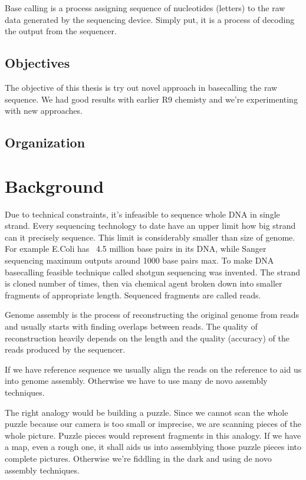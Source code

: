\documentclass[times, utf8, diplomski, english]{fer}
\begin{document}
Base calling is a process assigning sequence of nucleotides (letters) to the raw data generated by the sequencing device. Simply put, it is a process of decoding the output from the sequencer.

\section{Objectives}

The objective of this thesis is try out novel approach in basecalling the raw sequence. We had good results with earlier R9 chemisty \citep{miculinic2017mincall} and we're experimenting with new approaches.

\section{Organization}


\chapter{Background}
\label{chap:background}

Due to technical constraints, it's infeasible  to sequence whole DNA in single strand. 
Every sequencing technology to date have an upper limit how big strand can it precisely sequence.
This limit is considerably smaller than size of genome.
For example E.Coli has ~4.5 million base pairs in its DNA, while Sanger sequencing maximum outputs around 1000 base pairs max.
To make DNA basecalling feasible technique called shotgun sequencing was invented. 
The strand is cloned number of times, then via chemical  agent broken down into smaller fragments of appropriate length. 
Sequenced fragments are called reads.

Genome assembly is the process of reconstructing the original genome from reads and usually starts with finding overlaps between reads.
The quality of reconstruction heavily depends on the length and the quality (accuracy) of the reads produced by the sequencer. 

If we have reference sequence we usually align the reads on the reference to aid us into genome assembly. Otherwise we have to use many de novo assembly techniques.

The right analogy would be building a puzzle. Since we cannot scan the whole puzzle because our camera is too small or imprecise, we are scanning pieces of the whole picture. Puzzle pieces would represent fragments in this analogy. If we have a map, even a rough one, it shall aids us into assemblying those puzzle pieces into complete pictures. Otherwise we're fiddling in the dark and using de novo assembly techniques.
\end{document}
